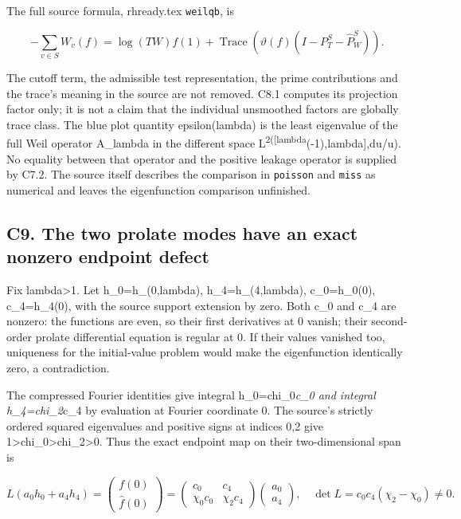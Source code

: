 \documentclass[
]{article}
\begin{document}
The full source formula, rhready.tex \texttt{weilqb}, is

\[
-\sum_{v\in S}W_v(f)=\log(TW)f(1)
+\operatorname{Trace}\!\left(\vartheta(f)
(I-P_T^S-\widehat P_W^S)\right).
\tag{C8.2}
\]

The cutoff term, the admissible test representation, the prime
contributions and the trace's meaning in the source are not removed.
C8.1 computes its projection factor only; it is not a claim that the
individual unsmoothed factors are globally trace class. The blue plot
quantity epsilon(lambda) is the least eigenvalue of the full Weil
operator A\_lambda in the different space
L\textsuperscript{2({[}lambda}(-1),lambda{]},du/u). No equality between
that operator and the positive leakage operator is supplied by C7.2. The
source itself describes the comparison in \texttt{poisson} and
\texttt{miss} as numerical and leaves the eigenfunction comparison
unfinished.

\subsection{C9. The two prolate modes have an exact nonzero endpoint
defect}\label{c9.-the-two-prolate-modes-have-an-exact-nonzero-endpoint-defect}

Fix lambda\textgreater1. Let h\_0=h\_(0,lambda), h\_4=h\_(4,lambda),
c\_0=h\_0(0), c\_4=h\_4(0), with the source support extension by zero.
Both c\_0 and c\_4 are nonzero: the functions are even, so their first
derivatives at 0 vanish; their second-order prolate differential
equation is regular at 0. If their values vanished too, uniqueness for
the initial-value problem would make the eigenfunction identically zero,
a contradiction.

The compressed Fourier identities give integral h\_0=chi\_0\emph{c\_0
and integral h\_4=chi\_2}c\_4 by evaluation at Fourier coordinate 0. The
source's strictly ordered squared eigenvalues and positive signs at
indices 0,2 give 1\textgreater chi\_0\textgreater chi\_2\textgreater0.
Thus the exact endpoint map on their two-dimensional span is

\[
L(a_0h_0+a_4h_4)=
\begin{pmatrix}f(0)\\\widehat f(0)\end{pmatrix}
=\begin{pmatrix}c_0&c_4\\\chi_0c_0&\chi_2c_4\end{pmatrix}
\begin{pmatrix}a_0\\a_4\end{pmatrix},
\quad\det L=c_0c_4(\chi_2-\chi_0)\ne0.
\tag{C9.1}
\]
\end{document}
